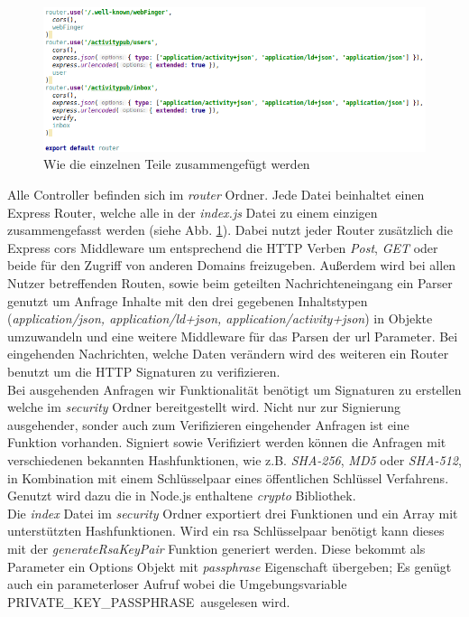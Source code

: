 \begin{figure}[h]
	\centering
	\includegraphics[width=15cm]{figures/router-index.png}
	\caption{Wie die einzelnen Teile zusammengefügt werden}
	\label{fig:router-index}
\end{figure}
Alle Controller befinden sich im  \textit{router} Ordner. Jede Datei beinhaltet einen Express Router, welche alle in der \textit{index.js} Datei zu einem einzigen zusammengefasst werden (siehe Abb. \ref{fig:router-index}). Dabei nutzt jeder Router zusätzlich die Express \gls{cors} Middleware um entsprechend die HTTP Verben \textit{Post}, \textit{GET} oder beide für den Zugriff von anderen Domains freizugeben. Außerdem wird bei allen Nutzer betreffenden Routen, sowie beim geteilten Nachrichteneingang ein Parser genutzt um Anfrage Inhalte mit den drei gegebenen Inhaltstypen (\textit{application/json, application/ld+json, application/activity+json}) in Objekte umzuwandeln und eine weitere Middleware für das Parsen der \gls{url} Parameter. Bei eingehenden Nachrichten, welche Daten verändern wird des weiteren ein Router benutzt um die HTTP Signaturen zu verifizieren.\\

Bei ausgehenden Anfragen wir Funktionalität benötigt um Signaturen zu erstellen welche im \textit{security} Ordner bereitgestellt wird. Nicht nur zur Signierung ausgehender, sonder auch zum Verifizieren eingehender Anfragen ist eine Funktion vorhanden. Signiert sowie Verifiziert werden können die Anfragen mit verschiedenen bekannten Hashfunktionen, wie z.B. \textit{SHA-256}, \textit{MD5} oder \textit{SHA-512}, in Kombination mit einem Schlüsselpaar eines öffentlichen Schlüssel Verfahrens. Genutzt wird dazu die in Node.js enthaltene \textit{crypto} Bibliothek.\\

Die \textit{index} Datei im \textit{security} Ordner exportiert drei Funktionen und ein Array mit unterstützten Hashfunktionen. Wird ein \gls{rsa} Schlüsselpaar benötigt kann dieses mit der \textit{generateRsaKeyPair} Funktion generiert werden. Diese bekommt als Parameter ein Options Objekt mit \textit{passphrase} Eigenschaft übergeben; Es genügt auch ein parameterloser Aufruf wobei die Umgebungsvariable \glqq PRIVATE\_KEY\_PASSPHRASE\grqq~ausgelesen wird.\\

